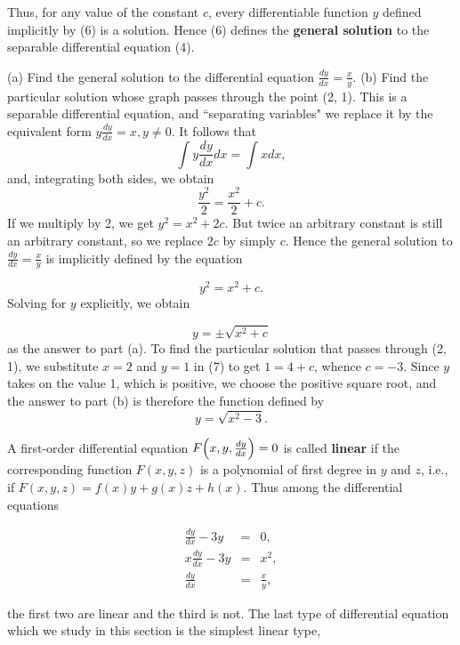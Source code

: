 \noindent Thus, for any value of the constant $c$, every differentiable function $y$ defined implicitly by (6) is a solution. Hence (6) defines the \textbf{general solution} to the separable differential equation (4).
\medskip

\begin{example} 
(a) Find the general solution to the differential equation $\frac{dy}{dx} = \frac{x}{y}$. 
(b) Find the particular solution whose graph passes through the point (2, 1). This is a separable differential equation, and ``separating variables" we replace it by the equivalent form $y\frac{dy}{dx} = x, y \neq 0$. It follows that   
$$
\int y \frac{dy}{dx} dx = \int x dx,
$$
\noindent and, integrating both sides, we obtain
$$
\frac{y^{2}}{2} = \frac{x^{2}}{2} + c.
$$
\noindent If we multiply by 2, we get $y^{2} = x^{2} + 2c$. But twice an arbitrary constant is still an arbitrary constant, so we replace $2c$ by simply $c$. Hence the general solution to $\frac{dy}{dx} = \frac{x}{y}$ is implicitly defined by the equation  

\begin{equation}
y^2 = x^{2} + c.  
\label{eq5.5.7}
\end{equation}
\noindent Solving for $y$ explicitly, we obtain 

$$
y = \pm \sqrt{x^{2} + c}
$$
\noindent as the answer to part (a). To find the particular solution that passes through (2, 1), we substitute $x = 2$ and $y = 1$ in (7) to get $1 = 4 + c$, whence $c = - 3$. Since $y$ takes on the value 1, which is positive, we choose the positive square root, and the answer to part (b) is therefore the function defined by
$$
y= \sqrt{x^{2} - 3}.
$$
\end{example}
\medskip

A first-order differential equation $F \Bigl(x, y, \frac{dy}{dx} \Bigr) = 0$ is called \textbf{linear} if the corresponding function $F(x, y, z)$ is a polynomial of first degree in $y$ and $z$, i.e., if $F(x, y, z) = f(x)y + g(x)z + h(x)$. Thus among the differential equations

\begin{eqnarray*}
  \frac{dy}{dx} - 3y &=& 0, \\
x \frac{dy}{dx} - 3y &=& x^{2},\\
       \frac{dy}{dx} &=& \frac{x}{y},
\end{eqnarray*}

\noindent the first two are linear and the third is not. The last type of differential equation which we study in this section is the simplest linear type,

